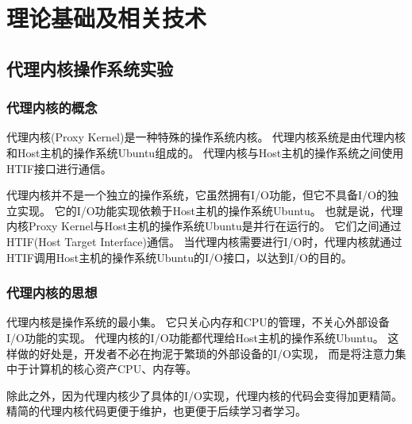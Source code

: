 %
%
%
%
%
%

\chapter{理论基础及相关技术}

\section{代理内核操作系统实验}

\subsection{代理内核的概念}

代理内核(Proxy Kernel)是一种特殊的操作系统内核。
代理内核系统是由代理内核和Host主机的操作系统Ubuntu组成的。
代理内核与Host主机的操作系统之间使用HTIF接口进行通信。

代理内核并不是一个独立的操作系统，它虽然拥有I/O功能，但它不具备I/O的独立实现。
它的I/O功能实现依赖于Host主机的操作系统Ubuntu。
也就是说，代理内核Proxy Kernel与Host主机的操作系统Ubuntu是并行在运行的。
它们之间通过HTIF(Host Target Interface)通信。
当代理内核需要进行I/O时，代理内核就通过HTIF调用Host主机的操作系统Ubuntu的I/O接口，以达到I/O的目的。

\subsection{代理内核的思想}

代理内核是操作系统的最小集。
它只关心内存和CPU的管理，不关心外部设备I/O功能的实现。
代理内核的I/O功能都代理给Host主机的操作系统Ubuntu。
这样做的好处是，开发者不必在拘泥于繁琐的外部设备的I/O实现，
而是将注意力集中于计算机的核心资产CPU、内存等。

除此之外，因为代理内核少了具体的I/O实现，代理内核的代码会变得加更精简。
精简的代理内核代码更便于维护，也更便于后续学习者学习。

